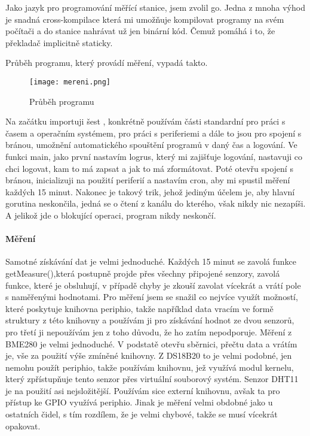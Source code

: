 Jako jazyk pro programování měřící stanice, jsem zvolil \gls{go}. Jedna z mnoha výhod je snadná \gls{cross-kompilace} 
která mi umožňuje kompilovat programy na svém počítači a do stanice nahrávat už jen binární kód. Čemuž pomáhá i to, že 
překladač implicitně  staticky.

Průběh programu, který provádí měření, vypadá takto.

\begin{figure}[H]
		\centering
    \texttt{[image: mereni.png]}
    \caption{Průběh programu}
\end{figure}

Na začátku importuji šest , konkrétně používám části standardní  
pro práci s časem a operačním systémem,  pro práci s periferiemi a dále to jsou 
 pro spojení s bránou, umožnění automatického spouštění programů v daný čas a logování. Ve 
funkci main, jako první nastavím  logrus, který mi zajišťuje logování, nastavuji co chci 
logovat, kam to má zapsat a jak to má zformátovat. Poté otevřu spojení s bránou, inicializuji 
 na použití periferií a nastavím cron, aby mi spustil měření každých 15 minut. Nakonec je 
takový trik, jehož jediným účelem je, aby hlavní gorutina neskončila, jedná se o čtení z kanálu do kterého, však nikdy 
nic nezapíši. A jelikož jde o blokující operaci, program nikdy neskončí.

\paragraph*{Měření}
Samotné získávání dat je velmi jednoduché. Každých 15 minut se zavolá funkce getMeasure(),která postupně projde přes 
všechny připojené senzory, zavolá funkce, které je obsluhují, v případě chyby je zkouší zavolat vícekrát a vrátí pole 
s naměřenými hodnotami. Pro měření jsem se snažil co nejvíce využít možností, které poskytuje  \gls{knihovna} 
\gls{periphio}, takže například data vracím ve formě struktury z této knihovny a používám ji pro získávání hodnot ze 
dvou senzorů, pro třetí ji nepoužívám jen z toho důvodu, že ho zatím nepodporuje. Měření z BME280 je velmi jednoduché. 
V podstatě otevřu sběrnici, přečtu data a vrátím je, vše za použití výše zmíněné knihovny. Z DS18B20 to je velmi podobné, 
jen nemohu použít \gls{periphio}, takže používám knihovnu, jež využívá modul kernelu, který zpřístupňuje tento senzor 
přes virtuální souborový systém. Senzor DHT11 je na použití asi nejsložitější. Používám sice externí knihovnu, avšak ta 
pro přístup ke GPIO využívá \gls{periphio}. Jinak je měření velmi obdobné jako u ostatních čidel, s tím rozdílem, že je 
velmi chybové, takže se musí vícekrát opakovat.

